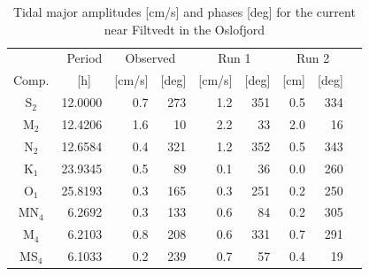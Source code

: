 \begin{table}[ht]
\caption{Tidal major amplitudes [cm/s] and phases [deg] for the current near Filtvedt in the Oslofjord}
\label{tab:Filtvedt}
\centering
\begin{tabular}{crrrrrrrr} \hline
      & Period & \multicolumn{2}{c}{Observed} & \multicolumn{2}{c}{Run 1} & \multicolumn{2}{c}{Run 2} \\
Comp. & [h] $\;\;$ & [cm/s] & [deg] & [cm/s] & [deg] & [cm] & [deg] \\ \hline 
S$_2$  & 12.0000 &  0.7 & 273  &   1.2 & 351  &  0.5 & 334  \\
M$_2$  & 12.4206 &  1.6 &  10  &   2.2 &  33  &  2.0 &  16  \\
N$_2$  & 12.6584 &  0.4 & 321  &   1.2 & 352  &  0.5 & 343  \\
K$_1$  & 23.9345 &  0.5 &  89  &   0.1 &  36  &  0.0 & 260  \\
O$_1$  & 25.8193 &  0.3 & 165  &   0.3 & 251  &  0.2 & 250  \\
MN$_4$ &  6.2692 &  0.3 & 133  &   0.6 &  84  &  0.2 & 305  \\
M$_4$  &  6.2103 &  0.8 & 208  &   0.6 & 331  &  0.7 & 291  \\
MS$_4$ &  6.1033 &  0.2 & 239  &   0.7 &  57  &  0.4 &  19  \\ \hline 
\end{tabular}
\end{table}

